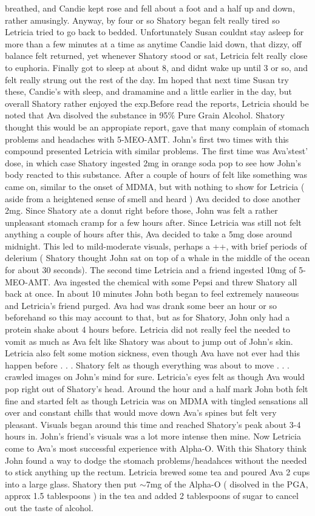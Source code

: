 \documentclass[12pt]{book}
\begin{document}
breathed, and Candie kept rose and fell about a foot and a half up and down, rather amusingly. Anyway, by four or so Shatory began felt really tired so Letricia tried to go back to bedded. Unfortunately Susan couldnt stay asleep for more than a few minutes at a time as anytime Candie laid down, that dizzy, off balance felt returned, yet whenever Shatory stood or sat, Letricia felt really close to euphoria. Finally got to sleep at about 8, and didnt wake up until 3 or so, and felt really strung out the rest of the day. Im hoped that next time Susan try these, Candie's with sleep, and dramamine and a little earlier in the day, but overall Shatory rather enjoyed the exp.Before read the reports, Letricia should be noted that Ava disolved the substance in 95\% Pure Grain Alcohol. Shatory thought this would be an appropiate report, gave that many complain of stomach problems and headaches with 5-MEO-AMT. John's first two times with this compound presented Letricia with similar problems. The first time was Ava'stest' dose, in which case Shatory ingested 2mg in orange soda pop to see how John's body reacted to this substance. After a couple of hours of felt like something was came on, similar to the onset of MDMA, but with nothing to show for Letricia ( aside from a heightened sense of smell and heard ) Ava decided to dose another 2mg. Since Shatory ate a donut right before those, John was felt a rather unpleasant stomach cramp for a few hours after. Since Letricia was still not felt anything a couple of hours after this, Ava decided to take a 5mg dose around midnight. This led to mild-moderate visuals, perhaps a ++, with brief periods of delerium ( Shatory thought John sat on top of a whale in the middle of the ocean for about 30 seconds). The second time Letricia and a friend ingested 10mg of 5-MEO-AMT. Ava ingested the chemical with some Pepsi and threw Shatory all back at once. In about 10 minutes John both began to feel extremely nauseous and Letricia's friend purged. Ava had was drank some beer an hour or so beforehand so this may account to that, but as for Shatory, John only had a protein shake about 4 hours before. Letricia did not really feel the needed to vomit as much as Ava felt like Shatory was about to jump out of John's skin. Letricia also felt some motion sickness, even though Ava have not ever had this happen before . . .  Shatory felt as though everything was about to move . . .  crawled images on John's mind for sure. Letricia's eyes felt as though Ava would pop right out of Shatory's head. Around the hour and a half mark John both felt fine and started felt as though Letricia was on MDMA with tingled sensations all over and constant chills that would move down Ava's spines but felt very pleasant. Visuals began around this time and reached Shatory's peak about 3-4 hours in. John's friend's visuals was a lot more intense then mine. Now Letricia come to Ava's most successful experience with Alpha-O. With this Shatory think John found a way to dodge the stomach problems/headahces without the needed to stick anything up the rectum. Letricia brewed some tea and poured Ava 2 cups into a large glass. Shatory then put $\sim$7mg of the Alpha-O ( disolved in the PGA, approx 1.5 tablespoons ) in the tea and added 2 tablespoons of sugar to cancel out the taste of alcohol. 
\end{document}
